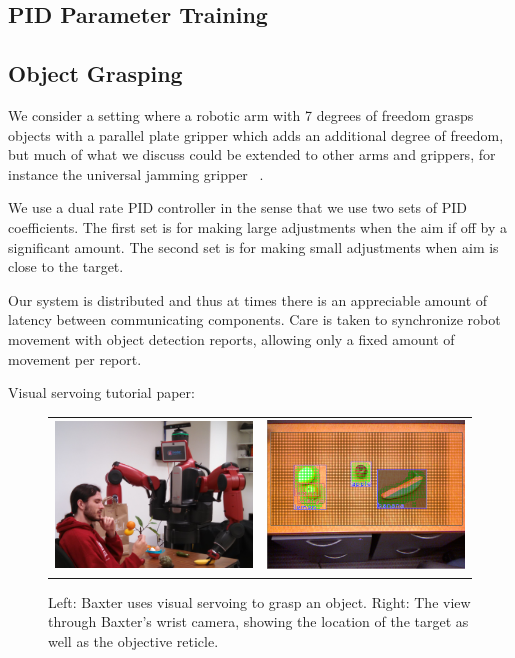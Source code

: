 
\subsection{PID Parameter Training}












\subsection{Object Grasping}

We consider a setting where a robotic arm
with 7 degrees of freedom grasps objects with a parallel plate gripper which adds
an additional degree of freedom, but much of what we discuss could be extended to other
arms and grippers, for instance the universal jamming gripper ~\citep{}.

We use a dual rate PID controller in the sense that we use two sets of PID coefficients. The
first set is for making large adjustments when the aim if off by a significant amount. The
second set is for making small adjustments when aim is close to the target.

Our system is distributed and thus at times there is an appreciable amount of latency between
communicating components. Care is taken to synchronize robot movement with object detection
reports, allowing only a fixed amount of movement per report.

Visual servoing tutorial paper: \citep{chaumette06}

\begin{figure}
  \begin{center}
    \begin{tabular}{l c}
      \includegraphics[width=200px, height=150px]{robo2.png} &
      \includegraphics[width=200px, height=150px]{screen2.png} \\
    \end{tabular}
  \end{center}
  \caption{Left: Baxter uses visual servoing to grasp an object. Right: The view through Baxter's wrist camera, 
    showing the location of the target as well as the objective reticle.}
\end{figure}

